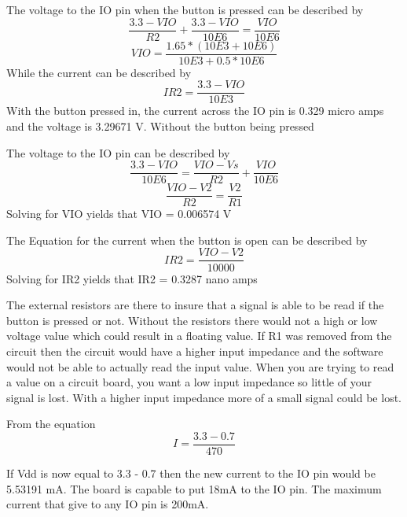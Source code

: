\documentclass[11pt,a4]{report}
\begin{document}
The voltage to the IO pin when the button is pressed can be described by 
\begin{equation}
    \frac{3.3-VIO}{R2}+\frac{3.3-VIO}{10E6}=\frac{VIO}{10E6}
\end{equation}
\begin{equation}
    VIO = \frac{1.65*(10E3+10E6)}{10E3+0.5*10E6}
\end{equation}
While the current can be described by 
\begin{equation}
   IR2 = \frac{3.3-VIO}{10E3}
\end{equation}
With the button pressed in, the current across the IO pin is 0.329 micro amps and the voltage is 3.29671 V. 
\newline
Without the button being pressed

The voltage to the IO pin can be described by 
\begin{equation}
  \frac{3.3-VIO}{10E6}=\frac{VIO-Vs}{R2}+\frac{VIO}{10E6}
\end{equation}
\begin{equation}
    \frac{VIO-V2}{R2}=\frac{V2}{R1}
\end{equation}
Solving for VIO yields that VIO = 0.006574 V

The Equation for the current when the button is open can be described by
\begin{equation}
    IR2 = \frac{VIO-V2}{10000}
\end{equation}
Solving for IR2 yields that IR2 = 0.3287 nano amps

The external resistors are there to insure that a signal is able to be read if the button is pressed or not. Without the resistors there would not a high or low voltage value which could result in a floating value. If R1 was removed from the circuit then the circuit would have a higher input impedance and the software would not be able to actually read the input value. When you are trying to read a value on a circuit board, you want a low input impedance so little of your signal is lost. With a higher input impedance more of a small signal could be lost.

From the equation 
\begin{equation}
    I = \frac{3.3-0.7}{470}
\end{equation}

If Vdd is now equal to 3.3 - 0.7 then the new current to the IO pin would be 5.53191 mA. The board is capable to put 18mA to the IO pin. The maximum current that give to any IO pin is 200mA. 
\end{document}

